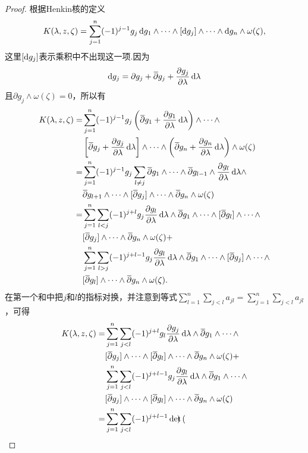 \begin{proof}
	根据Henkin核的定义
	\[K(\lambda,z,\zeta)=\sum_{j=1}^{n}(-1)^{j-1}g_j\mathop{}\!\mathrm{d} g_1\wedge\cdots\wedge[\mathop{}\!\mathrm{d} g_j]\wedge\cdots\wedge\mathop{}\!\mathrm{d} g_n\wedge\omega(\zeta),\]
	这里$[\mathop{}\!\mathrm{d} g_j]$表示乘积中不出现这一项.因为
	\[\mathop{}\!\mathrm{d} g_j=\partial g_j+{}\mkern1mu\overline{\mkern-1mu\partial}g_j+\frac{\partial g_j}{\partial \lambda}\mathop{}\!\mathrm{d}\lambda\]
	且$\partial g_j\wedge\omega(\zeta)=0$，所以有
	\begin{align*}
		K(\lambda,z,\zeta)
		=&\sum_{j=1}^{n}(-1)^{j-1}g_j\left(\bar{\partial}g_1+\pp{g_1}{\lambda}\dif\lambda\right)\wedge\cdots\wedge\\
		&\left[\bar{\partial}g_j+\pp{g_j}{\lambda}\dif\lambda\right]\wedge\cdots\wedge\left(\bar{\partial}g_n+\pp{g_n}{\lambda}\dif\lambda\right)\wedge\omega(\zeta)\\
		=&\sum_{j=1}^{n}(-1)^{j-1}g_j\sum_{l\neq j}\bar{\partial}g_1\wedge\cdots\wedge\bar{\partial}g_{l-1}\wedge\pp{g_l}{\lambda}\dif\lambda\wedge\\
		&\bar{\partial}g_{l+1}\wedge\cdots\wedge[\bar{\partial}g_j]\wedge\cdots\wedge\bar{\partial}g_n\wedge\omega(\zeta)\\
		=&\sum_{j=1}^{n}\sum_{l<j}(-1)^{j+l}g_j\pp{g_l}{\lambda}\dif\lambda\wedge\bar{\partial}g_1\wedge\cdots\wedge[\bar{\partial}g_l]\wedge\cdots\wedge\\
		&[\bar{\partial}g_j]\wedge\cdots\wedge\bar{\partial}g_n\wedge\omega(\zeta)+\\
		&\sum_{j=1}^{n}\sum_{l>j}(-1)^{j+l-1}g_j\pp{g_l}{\lambda}\dif\lambda\wedge\bar{\partial}g_1\wedge\cdots\wedge[\bar{\partial}g_j]\wedge\cdots\wedge\\
		&[\bar{\partial}g_l]\wedge\cdots\wedge\bar{\partial}g_n\wedge\omega(\zeta).
	\end{align*}
	在第一个和中把$j$和$l$的指标对换，并注意到等式$\sum_{l=1}^{n}\sum_{j<l}a_{jl}=\sum_{j=1}^{n}\sum_{j<l}a_{jl}$，可得
	\begin{align*}
		K(\lambda,z,\zeta)=
		&\sum_{j=1}^{n}\sum_{j<l}(-1)^{j+l}g_l\frac{\partial g_j}{\partial \lambda}\mathop{}\!\mathrm{d}\lambda\wedge{}\mkern1mu\overline{\mkern-1mu\partial}g_1\wedge\cdots\wedge\\
		&[{}\mkern1mu\overline{\mkern-1mu\partial}g_j]\wedge\cdots\wedge[{}\mkern1mu\overline{\mkern-1mu\partial}g_l]\wedge\cdots\wedge{}\mkern1mu\overline{\mkern-1mu\partial}g_n\wedge\omega(\zeta)+\\
		&\sum_{j=1}^{n}\sum_{j<l}(-1)^{j+l-1}g_j\frac{\partial g_l}{\partial \lambda}\mathop{}\!\mathrm{d}\lambda\wedge{}\mkern1mu\overline{\mkern-1mu\partial}g_1\wedge\cdots\wedge\\
		&[{}\mkern1mu\overline{\mkern-1mu\partial}g_j]\wedge\cdots\wedge[{}\mkern1mu\overline{\mkern-1mu\partial}g_l]\wedge\cdots\wedge{}\mkern1mu\overline{\mkern-1mu\partial}g_n\wedge\omega(\zeta)\\
		=&\sum_{j=1}^{n}\sum_{j<l}(-1)^{j+l-1}\det\begin{pmatrix}

\end{pmatrix}
\end{align*}
\end{proof}
